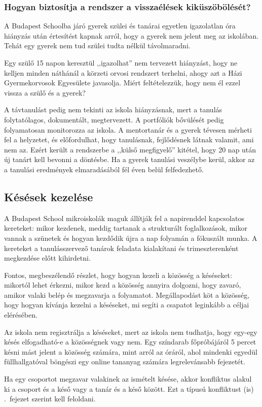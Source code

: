 \subsubsection{Hogyan biztosítja a rendszer a visszaélések kiküszöbölését?}
A Budapest Schoolba járó gyerek szülei és tanárai egyetlen igazolatlan óra hiányzás után értesítést kapnak arról, hogy a gyerek nem jelent meg az iskolában. Tehát egy gyerek nem tud szülei tudta nélkül távolmaradni.

Egy szülő 15 napon keresztül ,,igazolhat'' nem tervezett hiányzást, hogy ne kelljen minden náthánál a körzeti orvosi rendszert terhelni, ahogy azt a Házi Gyermekorvosok Egyesülete javasolja. Miért feltételezzük, hogy nem él ezzel vissza a szülő és a gyerek? 

A távtanulást pedig nem tekinti az iskola hiányzásnak, mert a tanulás folytatólagos, dokumentált, megtervezett. A portfóliók bővülését pedig folyamatosan monitorozza az iskola. A mentortanár és a gyerek tévesen mérheti fel a helyzetet, és előfordulhat, hogy tanulásnak, fejlődésnek látnak valamit, ami nem az. Ezért került a rendszerbe a ,,külső megfigyelő'' kitétel, hogy 20 nap után új tanárt kell bevonni a döntésbe. Ha a gyerek tanulási veszélybe kerül, akkor az a tanulási eredmények elmaradásából fél éven belül felfedezhető.

\subsection{Késések kezelése}
A Budapest School mikroiskolák maguk állítják fel a napirenddel kapcsolatos kereteket: mikor kezdenek, meddig tartanak a strukturált foglalkozások, mikor vannak a szünetek és hogyan kezdődik újra a nap folyamán a fóku\-szált munka. A kereteket a tanulásszervező tanárok feladata kialakítani és trimeszterenként megkezdése előtt kihirdetni.

Fontos, megbeszélendő részlet, hogy hogyan kezeli a közösség a késéseket: mikortól lehet érkezni, mikor kezd a közösség annyira dolgozni, hogy zavaró, amikor valaki belép és megzavarja a folyamatot. Megállapodást köt a közösség, hogy hogyan kívánja kezelni a késéseket, mi segíti a csapatot leginkább a céljai elérésében.

Az iskola nem regisztrálja a késéseket, mert az iskola nem tudhatja, hogy egy-egy késés elfogadható-e a közösségnek vagy nem. Egy színdarab főpróbájáról 5 percet késni mást jelent a közösség számára, mint arról az óráról, ahol mindenki egyedül füllhallgatóval böngészi egy online tananyag számára legrelevánsabb fejezetét.

Ha egy csoportot megzavar valakinek az ismételt késése, akkor konfliktus alakul ki a csoport és a késő vagy a tanár és a késő között. Ezt a típusú konfliktust (is) .~fejezet szerint kell feloldani.